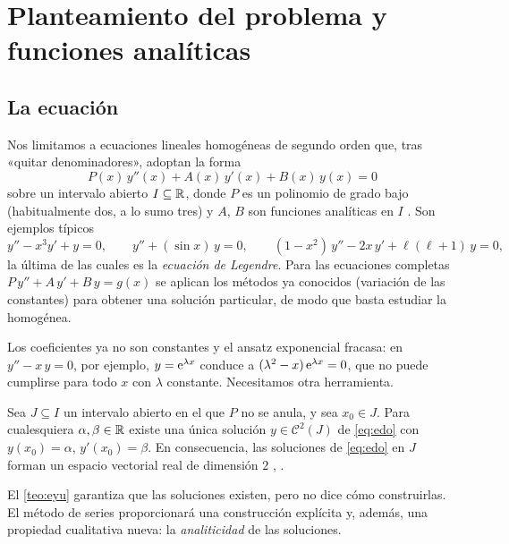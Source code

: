 \section{Planteamiento del problema y funciones analíticas}\label{sec:planteamiento}

\subsection{La ecuación}\label{sec:ecuacion}
Nos limitamos a ecuaciones lineales homogéneas de segundo orden que, tras
«quitar denominadores», adoptan la forma
\begin{equation}\label{eq:edo}
  \boxed{\;P(x)\,y''(x)+A(x)\,y'(x)+B(x)\,y(x)=0\;}
\end{equation}
sobre un intervalo abierto $I\subseteq\mathbb{R}$, donde $P$ es un polinomio de grado
bajo (habitualmente dos, a lo sumo tres) y $A$, $B$ son funciones analíticas
en $I$ \cite{TEMAV}. Son ejemplos típicos
\[
  y''-x^{3}y'+y=0,\qquad
  y''+(\sin x)\,y=0,\qquad
  (1-x^{2})\,y''-2x\,y'+\ell(\ell+1)\,y=0 ,
\]
la última de las cuales es la \emph{ecuación de Legendre}. Para las
ecuaciones completas $P\,y''+A\,y'+B\,y=g(x)$ se aplican los métodos ya
conocidos (variación de las constantes) para obtener una solución
particular, de modo que basta estudiar la homogénea.

Los coeficientes ya no son constantes y el ansatz exponencial fracasa: en
$y''-x\,y=0$, por ejemplo, $y=\mathrm{e}^{\lambda x}$ conduce a
$(\lambda^{2}-x)\,\mathrm{e}^{\lambda x}=0$, que no puede cumplirse para todo $x$
con $\lambda$ constante. Necesitamos otra herramienta.

\begin{teorema}\label{teo:eyu}
Sea $J\subseteq I$ un intervalo abierto en el que $P$ no se anula, y sea
$x_0\in J$. Para cualesquiera $\alpha,\beta\in\mathbb{R}$ existe una única solución
$y\in\mathcal C^{2}(J)$ de \eqref{eq:edo} con $y(x_0)=\alpha$,
$y'(x_0)=\beta$. En consecuencia, las soluciones de \eqref{eq:edo} en $J$
forman un espacio vectorial real de dimensión $2$
\textup{\cite{ELSGOLTZ}, \cite[cap.~IV]{TEMAV}}.
\end{teorema}

El \cref{teo:eyu} garantiza que las soluciones existen, pero no dice cómo
construirlas. El método de series proporcionará una construcción explícita
y, además, una propiedad cualitativa nueva: la \emph{analiticidad} de las
soluciones.

